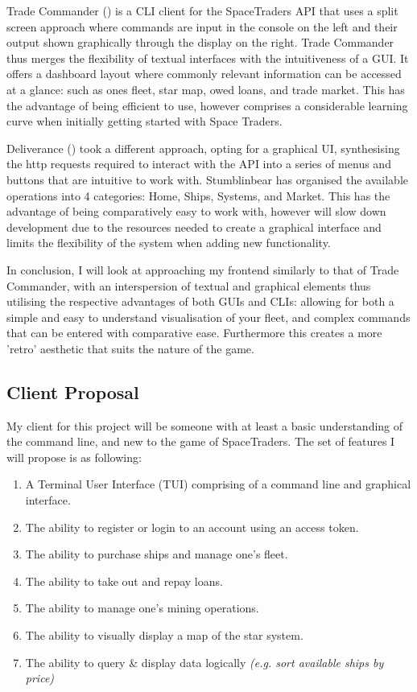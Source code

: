 
Trade Commander (\textcite{tradecommander}) is a CLI client for the SpaceTraders API that uses a split screen approach where commands are input in the console on the left and their output shown graphically through the display on the right. Trade Commander thus merges the flexibility of textual interfaces with the intuitiveness of a GUI. It offers a dashboard layout where commonly relevant information can be accessed at a glance: such as ones fleet, star map, owed loans, and trade market. This has the advantage of being efficient to use, however comprises a considerable learning curve when initially getting started with Space Traders.  

\bigskip
{}

Deliverance (\textcite{deliverance}) took a different approach, opting for a graphical UI, synthesising the http requests required to interact with the API into a series of menus and buttons that are intuitive to work with. Stumblinbear has organised the available operations into 4 categories: Home, Ships, Systems, and Market. This has the advantage of being comparatively easy to work with, however will slow down development due to the resources needed to create a graphical interface and limits the flexibility of the system when adding new functionality.

In conclusion, I will look at approaching my frontend similarly to that of Trade Commander, with an interspersion of textual and graphical elements thus utilising the respective advantages of both GUIs and CLIs: allowing for both a simple and easy to understand visualisation of your fleet, and complex commands that can be entered with comparative ease. Furthermore this creates a more 'retro' aesthetic that suits the nature of the game. 

\subsection{Client Proposal}
My client for this project will be someone with at least a basic understanding of the command line, and new to the game of SpaceTraders. The set of features I will propose is as following:
\begin{enumerate}
    \item A Terminal User Interface (TUI) comprising of a command line and graphical interface.
    \item The ability to register or login to an account using an access token.
    \item The ability to purchase ships and manage one's fleet.
    \item The ability to take out and repay loans.
    \item The ability to manage one's mining operations.
    \item The ability to visually display a map of the star system.
    \item The ability to query \& display data logically \textit{(e.g. sort available ships by price)}
\end{enumerate}

